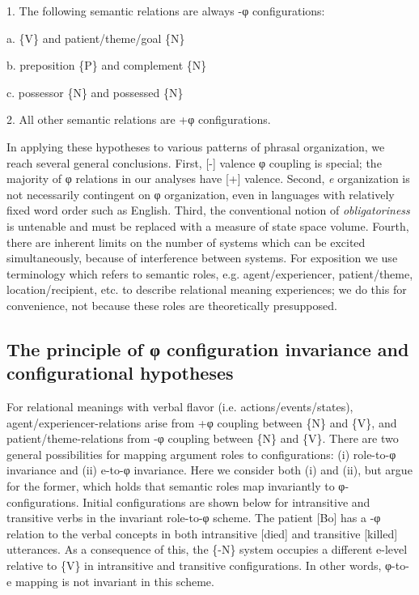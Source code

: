1. The following semantic relations are always -φ configurations:

  a. \{V\} and patient/theme/goal \{N\}

  b. preposition \{P\} and complement \{N\}

  c. possessor \{N\} and possessed \{N\}

2. All other semantic relations are +φ configurations.

  In applying these hypotheses to various patterns of phrasal organization, we reach several general conclusions. First, [-] valence φ coupling is special; the majority of φ relations in our analyses have [+] valence. Second, \textit{e} organization is not necessarily contingent on φ organization, even in languages with relatively fixed word order such as English. Third, the conventional notion of \textit{obligatoriness} is untenable and must be replaced with a measure of state space volume. Fourth, there are inherent limits on the number of systems which can be excited simultaneously, because of interference between systems. For exposition we use terminology which refers to semantic roles, e.g. agent/experiencer, patient/theme, location/recipient, etc. to describe relational meaning experiences; we do this for convenience, not because these roles are theoretically presupposed.

\subsection{The principle of \textup{φ configuration} invariance and configurational hypotheses}

For relational meanings with verbal flavor (i.e. actions/events/states), agent/experiencer-relations arise from +φ coupling between \{N\} and \{V\}, and patient/theme-relations from -φ coupling between \{N\} and \{V\}. There are two general possibilities for mapping argument roles to configurations: (i) role-to-φ invariance and (ii) e-to-φ invariance. Here we consider both (i) and (ii), but argue for the former, which holds that semantic roles map invariantly to φ-configurations. Initial configurations are shown below for intransitive and transitive verbs in the invariant role-to-φ scheme. The patient [Bo] has a -φ relation to the verbal concepts in both intransitive [died] and transitive [killed] utterances. As a consequence of this, the \{-N\} system occupies a different e-level relative to \{V\} in intransitive and transitive configurations. In other words, φ-to-e mapping is not invariant in this scheme.

